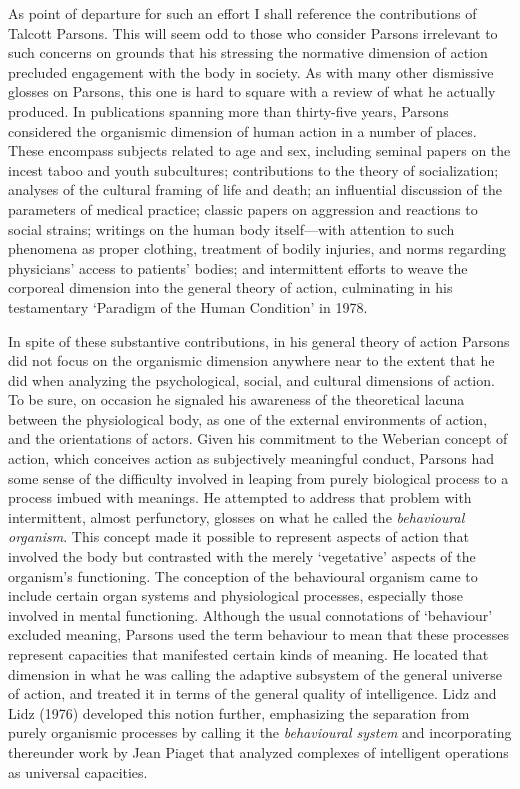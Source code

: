 As point of departure for such an effort I shall reference the contributions of Talcott Parsons. This will seem odd to those who consider Parsons irrelevant to such concerns on grounds that his stressing the normative dimension of action precluded engagement with the body in society. As with many other dismissive glosses on Parsons, this one is hard to square with a review of what he actually produced. In publications spanning more than thirty-five years, Parsons considered the organismic dimension of human action in a number of places. These encompass subjects related to age and sex, including seminal papers on the incest taboo and youth subcultures; contributions to the theory of socialization; analyses of the cultural framing of life and death; an influential discussion of the parameters of medical practice; classic papers on aggression and reactions to social strains; writings on the human body itself---with attention to such phenomena as proper clothing, treatment of bodily injuries, and norms regarding physicians' access to patients' bodies; and intermittent efforts to weave the corporeal dimension into the general theory of action, culminating in his testamentary `Paradigm of the Human Condition' in 1978.

In spite of these substantive contributions, in his general theory of action Parsons did not focus on the organismic dimension anywhere near to the extent that he did when analyzing the psychological, social, and cultural dimensions of action. To be sure, on occasion he signaled his awareness of the theoretical lacuna between the physiological body, as one of the external environments of action, and the orientations of actors. Given his commitment to the Weberian concept of action, which conceives action as subjectively meaningful conduct, Parsons had some sense of the difficulty involved in leaping from purely biological process to a process imbued with meanings. He attempted to address that problem with intermittent, almost perfunctory, glosses on what he called the \emph{behavioural organism}. This concept made it possible to represent aspects of action that involved the body but contrasted with the merely `vegetative' aspects of the organism's functioning. The conception of the behavioural organism came to include certain organ systems and physiological processes, especially those involved in mental functioning. Although the usual connotations of `behaviour' excluded meaning, Parsons used the term behaviour to mean that these processes represent capacities that manifested certain kinds of meaning. He located that dimension in what he was calling the adaptive subsystem of the general universe of action, and treated it in terms of the general quality of intelligence. Lidz and Lidz (1976) developed this notion further, emphasizing the separation from purely organismic processes by calling it the \emph{behavioural system} and incorporating thereunder work by Jean Piaget that analyzed complexes of intelligent operations as universal capacities.

